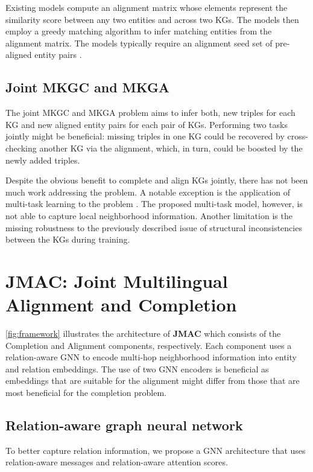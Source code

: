 \documentclass[11pt]{article}
\begin{document}
Existing models compute an alignment matrix whose elements represent the similarity score between any two entities   and  across two KGs. The models then employ a greedy matching algorithm \cite{greedymatch} to infer matching entities from the alignment matrix. The models typically require an alignment seed set  of pre-aligned entity pairs .


\subsection{Joint MKGC and MKGA} 

The joint MKGC and MKGA problem aims to infer both, new triples for each KG and new aligned entity pairs for each pair of KGs. Performing two tasks jointly might be beneficial:  missing triples  in one KG could be recovered by cross-checking another KG via the alignment, which, in turn, could be boosted by the newly added triples. 

Despite the obvious benefit to complete and align KGs jointly, there has not been much work addressing the problem. A notable exception is the application of multi-task learning to the problem \cite{singh2021multilingual}.  The proposed multi-task model, however, is not able to capture local neighborhood information. Another limitation is the  missing robustness to the previously described issue of structural inconsistencies between the  KGs during training.

\section{JMAC: Joint Multilingual Alignment and Completion}



\autoref{fig:framework} illustrates the architecture of \textbf{JMAC} which consists of the Completion and Alignment components, respectively. Each component uses a relation-aware GNN to encode multi-hop neighborhood information into entity and relation embeddings. The use of two GNN encoders is beneficial as embeddings that are suitable for the alignment might differ from those that are most beneficial for the completion problem.




\subsection{Relation-aware graph neural network}\label{ssec:relationgnn}

To better capture relation information, we propose a GNN architecture that uses relation-aware messages and relation-aware attention scores. 
\end{document}
